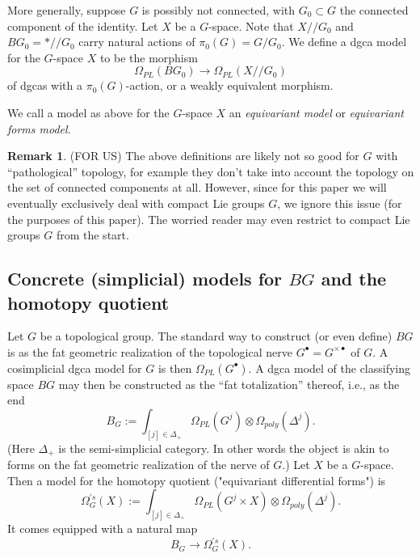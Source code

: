 \documentclass[a4paper]{amsart}
\theoremstyle{plain}
\theoremstyle{definition}
\newtheorem{rem}[thm]{Remark}
\begin{document}
More generally, suppose $G$ is possibly not connected, with $G_0\subset G$ the connected component of the identity. 
Let $X$ be a $G$-space. Note that $X//G_0$ and $BG_0= *//G_0$ carry natural actions of $\pi_0(G)=G/G_0$.
We define a dgca model for the $G$-space $X$ to be the morphism 
\[
 \Omega_{PL}(BG_0) \to \Omega_{PL}(X//G_0)
\]
of dgcas with a $\pi_0(G)$-action, or a weakly equivalent morphism.

We call a model as above for the $G$-space $X$ an \emph{equivariant model} or \emph{equivariant forms model}.



\begin{rem}(FOR US)
The above definitions are likely not so good for $G$ with ``pathological'' topology, for example they don't take into account the topology on the set of connected components at all.
However, since for this paper we will eventually exclusively deal with compact Lie groups $G$, we ignore this issue (for the purposes of this paper).
The worried reader may even restrict to compact Lie groups $G$ from the start.
\end{rem}

\subsection{Concrete (simplicial) models for \texorpdfstring{$BG$}{BG} and the homotopy quotient}\label{sec:simpl models BG}
Let $G$ be a topological group. The standard way to construct (or even define) $BG$ is as the fat geometric realization of the topological nerve $G^\bullet = G^{\times \bullet}$  of $G$.
A cosimplicial dgca model for $G$ is then $\Omega_{PL}(G^{\bullet})$.
A dgca model of the classifying space $BG$ may then be constructed as the ``fat totalization'' thereof, i.e., as the end
\[
B_G := \int_{[j]\in {\Delta_+}} \Omega_{PL}(G^j) \otimes \Omega_{poly}(\Delta^j).
\]
(Here $\Delta_+$ is the semi-simplicial category. In other words the object is akin to forms on the fat geometric realization of the nerve of $G$.)
Let $X$ be a $G$-space. Then a model for the homotopy quotient ("equivariant differential forms") is 
\[
\Omega_G^{'s}(X) := \int_{[j]\in \Delta_+} \Omega_{PL}(G^j\times X) \otimes \Omega_{poly}(\Delta^j).
\]
It comes equipped with a natural map
\[
B_G \to \Omega_G^{'s}(X).
\]
\end{document}
